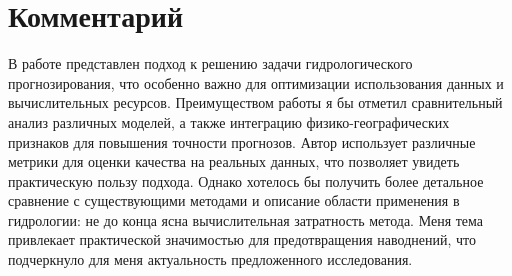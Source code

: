 \documentclass[11pt]{article}
\begin{document}
\section*{Комментарий}
В работе представлен подход к решению задачи гидрологического прогнозирования, что особенно важно для оптимизации
использования данных и вычислительных ресурсов. Преимуществом работы я бы отметил сравнительный анализ различных моделей,
а также интеграцию физико-географических признаков для повышения точности прогнозов. Автор использует различные
метрики для оценки качества на реальных данных, что позволяет увидеть практическую пользу подхода. Однако хотелось бы получить
более детальное сравнение с существующими методами и описание области применения в гидрологии: не до конца ясна вычислительная
затратность метода. Меня тема привлекает практической значимостью для предотвращения наводнений, что подчеркнуло для меня
актуальность предложенного исследования.
\end{document}
